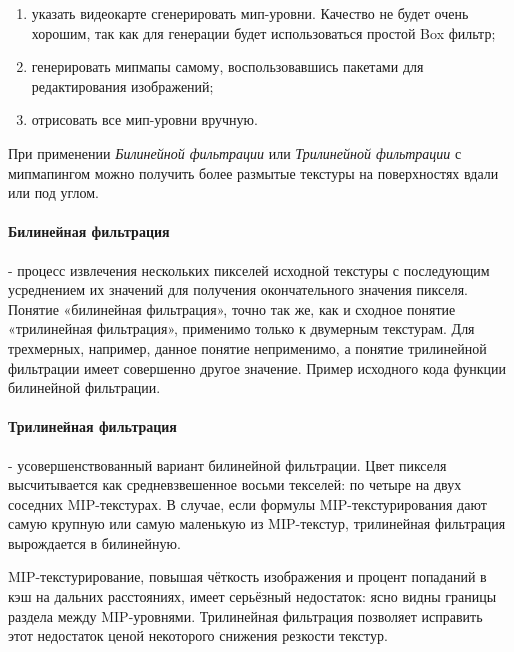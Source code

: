 \documentclass[a4paper, 10pt]{article}
\begin{document}
	\begin{enumerate}
		\item указать видеокарте сгенерировать мип-уровни. Качество не будет очень хорошим, так как для генерации будет использоваться простой Box фильтр;
		\item генерировать мипмапы самому, воспользовавшись пакетами для редактирования изображений;
		\item отрисовать все мип-уровни вручную.
	\end{enumerate}
	\hspace*{5mm} При применении \textit{Билинейной фильтрации} или \textit{Трилинейной фильтрации} с мипмапингом можно получить более размытые текстуры на поверхностях вдали или под углом. 
	\paragraph{Билинейная фильтрация} - процесс извлечения нескольких пикселей исходной текстуры с последующим усреднением их значений для получения окончательного значения пикселя. Понятие «билинейная фильтрация», точно так же, как и сходное понятие «трилинейная фильтрация», применимо только к двумерным текстурам. Для трехмерных, например, данное понятие неприменимо, а понятие трилинейной фильтрации имеет совершенно другое значение. Пример исходного кода функции билинейной фильтрации.
	\paragraph{Трилинейная фильтрация} - усовершенствованный вариант билинейной фильтрации. Цвет пикселя высчитывается как средневзвешенное восьми текселей: по четыре на двух соседних MIP-текстурах. В случае, если формулы MIP-текстурирования дают самую крупную или самую маленькую из MIP-текстур, трилинейная фильтрация вырождается в билинейную.
	
	 \vspace{0.8mm} \hspace*{5mm} MIP-текстурирование, повышая чёткость изображения и процент попаданий в кэш на дальних расстояниях, имеет серьёзный недостаток: ясно видны границы раздела между MIP-уровнями. Трилинейная фильтрация позволяет исправить этот недостаток ценой некоторого снижения резкости текстур.
\end{document}

